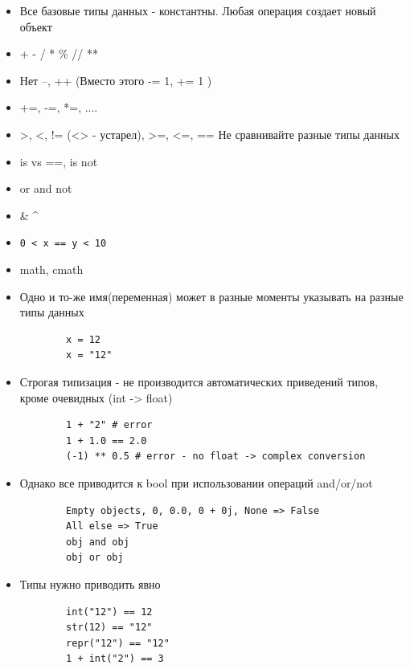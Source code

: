 \documentclass{article}
\begin{document}
\begin{itemize}
	\item Все базовые типы данных - константны. Любая операция создает новый объект
	\item + - / * \% // **
	\item Нет --, ++ (Вместо этого -= 1, += 1 )
	\item +=, -=, *=, ....
	\item >, <, != (<> - устарел), >=, <=, == Не сравнивайте разные типы данных
	\item is vs ==, is not
	\item or and not
	\item \& \hspace{10pt} \textbar \hspace{10pt} \textasciicircum
	\item \lstinline!0 < x == y < 10!
	\item math, cmath

\end{itemize}
\newpage

\Large
{
\begin{itemize}
	\item Одно и то-же имя(переменная) может в разные моменты указывать на разные типы данных
	\vspace{15pt}
	\begin{lstlisting}
		x = 12
		x = "12"
	\end{lstlisting}

	\item Строгая типизация - не производится автоматических приведений типов, кроме очевидных (int -> float)
	\vspace{15pt}
	\begin{lstlisting}
		1 + "2" # error
		1 + 1.0 == 2.0
		(-1) ** 0.5 # error - no float -> complex conversion
	\end{lstlisting}

	\item Однако все приводится к bool при использовании операций and/or/not
	\begin{lstlisting}
		Empty objects, 0, 0.0, 0 + 0j, None => False
		All else => True
		obj and obj
		obj or obj
	\end{lstlisting}

	\item Типы нужно приводить явно
	\vspace{15pt}
	\begin{lstlisting}
		int("12") == 12
		str(12) == "12"
		repr("12") == "12"
		1 + int("2") == 3
	\end{lstlisting}
\end{itemize}
}
\newpage
\end{document}

